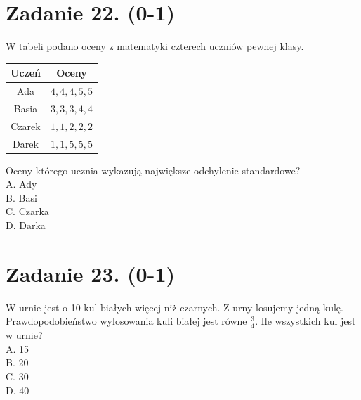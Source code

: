 \documentclass[10pt]{article}
\begin{document}
\section*{Zadanie 22. (0-1)}
W tabeli podano oceny z matematyki czterech uczniów pewnej klasy.

\begin{center}
\begin{tabular}{|c|c|}
\hline
Uczeń & Oceny \\
\hline
Ada & \(4,4,4,5,5\) \\
\hline
Basia & \(3,3,3,4,4\) \\
\hline
Czarek & \(1,1,2,2,2\) \\
\hline
Darek & \(1,1,5,5,5\) \\
\hline
\end{tabular}
\end{center}

Oceny którego ucznia wykazują największe odchylenie standardowe?\\
A. Ady\\
B. Basi\\
C. Czarka\\
D. Darka

\section*{Zadanie 23. (0-1)}
W urnie jest o 10 kul białych więcej niż czarnych. Z urny losujemy jedną kulę. Prawdopodobieństwo wylosowania kuli białej jest równe \(\frac{3}{4}\). Ile wszystkich kul jest w urnie?\\
A. 15\\
B. 20\\
C. 30\\
D. 40
\end{document}
